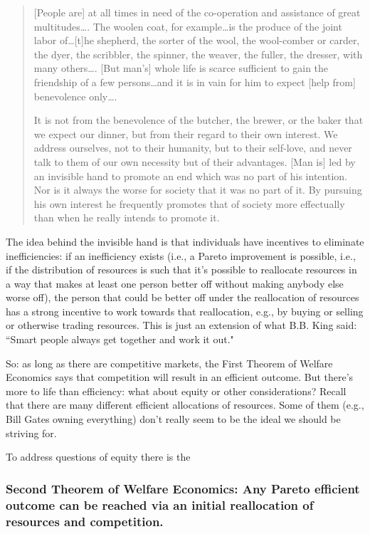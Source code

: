\begin{quotation}
[People are] at all times in need of the co-operation and assistance of great multitudes\ldots . The woolen coat, for example\ldots is the produce of the joint labor of\ldots [t]he shepherd, the sorter of the wool, the wool-comber or carder, the dyer, the scribbler, the spinner, the weaver, the fuller, the dresser, with many others\ldots . [But man's] whole life is scarce sufficient to gain the friendship of a few persons\ldots and it is in vain for him to expect [help from] benevolence only\ldots .

It is not from the benevolence of the butcher, the brewer, or the baker that we expect our dinner, but from their regard to their own interest. We address ourselves, not to their humanity, but to their self-love, and never talk to them of our own necessity but of their advantages. [Man is] led by an invisible hand to promote an end which was no part of his intention. Nor is it always the worse for society that it was no part of it. By pursuing his own interest he frequently promotes that of society more effectually than when he really intends to promote it.
\end{quotation}


The idea behind the invisible hand is that individuals have incentives to eliminate inefficiencies: if an inefficiency exists (i.e., a Pareto improvement is possible, i.e., if the distribution of resources is such that it's possible to reallocate resources in a way that makes at least one person better off without making anybody else worse off), the person that could be better off under the reallocation of resources has a strong incentive to work towards that reallocation, e.g., by buying or selling or otherwise trading resources. This is just an extension of what B.B. King said: ``Smart people always get together and work it out."

So: as long as there are competitive markets, the First Theorem of Welfare Economics says that competition will result in an efficient outcome. But there's more to life than efficiency: what about equity or other considerations? Recall that there are many different efficient allocations of resources. Some of them (e.g., Bill Gates owning everything) don't really seem to be the ideal we should be striving for.

 To address questions of equity there is the

\subsubsection*{Second Theorem of Welfare Economics: \rm Any Pareto efficient outcome can be reached via an initial reallocation of resources and competition.} 

